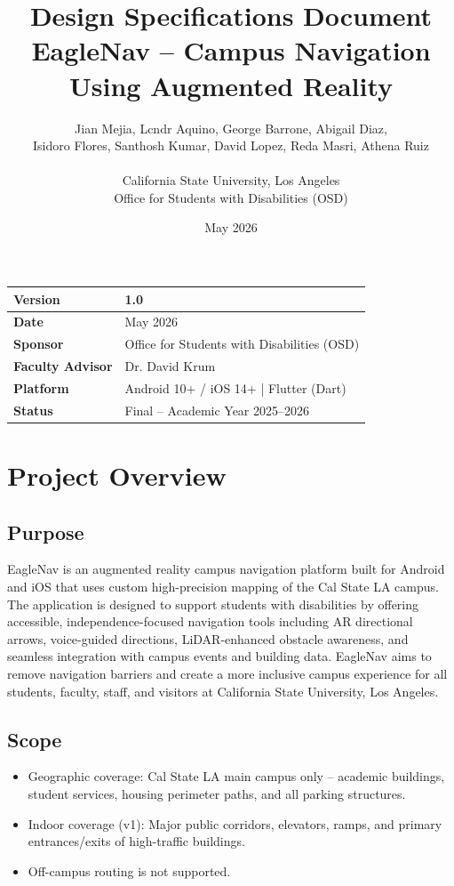 \documentclass[12pt]{article}
\title{\textbf{Design Specifications Document} \\ EagleNav -- Campus Navigation Using Augmented Reality}
\author{
Jian Mejia, Lcndr Aquino, George Barrone, Abigail Diaz, \\
Isidoro Flores, Santhosh Kumar, David Lopez, Reda Masri, Athena Ruiz \\
\\
California State University, Los Angeles \\
Office for Students with Disabilities (OSD)
}
\date{May 2026}
\begin{document}
\maketitle

\begin{center}
\begin{tabularx}{0.8\textwidth}{|l|X|}
\hline
\textbf{Version} & 1.0 \\
\hline
\textbf{Date} & May 2026 \\
\hline
\textbf{Sponsor} & Office for Students with Disabilities (OSD) \\
\hline
\textbf{Faculty Advisor} & Dr. David Krum \\
\hline
\textbf{Platform} & Android 10+ / iOS 14+ | Flutter (Dart) \\
\hline
\textbf{Status} & Final -- Academic Year 2025--2026 \\
\hline
\end{tabularx}
\end{center}

\newpage
\tableofcontents
\newpage

\section{Project Overview}

\subsection{Purpose}
EagleNav is an augmented reality campus navigation platform built for Android and iOS that uses custom high-precision mapping of the Cal State LA campus. The application is designed to support students with disabilities by offering accessible, independence-focused navigation tools including AR directional arrows, voice-guided directions, LiDAR-enhanced obstacle awareness, and seamless integration with campus events and building data. EagleNav aims to remove navigation barriers and create a more inclusive campus experience for all students, faculty, staff, and visitors at California State University, Los Angeles.

\subsection{Scope}
\begin{itemize}
    \item Geographic coverage: Cal State LA main campus only -- academic buildings, student services, housing perimeter paths, and all parking structures.
    \item Indoor coverage (v1): Major public corridors, elevators, ramps, and primary entrances/exits of high-traffic buildings.
    \item Off-campus routing is not supported.
\end{itemize}
\end{document}
